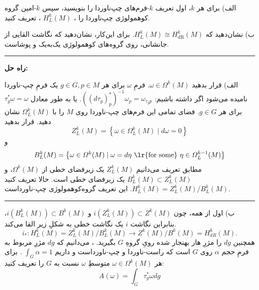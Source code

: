 \documentclass[a4paper, 12pt]{article}
\newenvironment{parind}{%
	\par%
	\medskip
	\leftskip=0mm\rightskip=7mm
	\noindent\ignorespaces}{%
	\par\medskip}
\begin{document}
\begin{parind}
	الف) برای هر $k$، اول تعریف $k$-فرم‌های چپ‌ناوردا را بنویسید، سپس $k$-امین گروه‌ کوهمولوژی چپ‌ناوردا را 
	،
	$H_L^k(M)$
	،
	تعریف کنید.
	
	ب) نشان‌دهید که 
		$H_L^k(M)\cong H_{\text{dR}}^k(M)$.
		برای این‌کار، نشان‌دهید که نگاشت القایی از جانشانی، روی گروه‌های کوهمولوژی یک‌به‌یک و پوشاست.
\end{parind}

\par\noindent\rule{\textwidth}{0.6pt}
\textbf{راه حل:}

الف)
 قرار بدهید $\omega \in \Omega^k(M)$.
  فرمِ $\omega$
   برای هر  $g \in G, p \in M$ یک فرمِ چپ-ناوردا نامیده می‌شود اگر داشته باشیم:
    $\left(\left(d \tau_g\right)_p^*\right)^{-1} \omega_p=\omega_{\tau_g p}$.
     یا به طور معادل $\tau_g^* \omega=\omega$ 
     برای هر
      $g \in G$.
      فضای تمامی این فرم‌های چپ-ناوردا روی
       $M$ 
       را با 
        $\Omega_L^k(M)$
        نشان دهید.
قرار بدهید
$$
Z_L^k(M)=\left\{\omega \in \Omega_L^k(M) \mid d \omega=0\right\}
$$
و
$$
B_L^k(M)=\left\{\omega \in \Omega^k(M) \mid \omega=d \eta \text { \lr{for some} } \eta \in \Omega_L^{k-1}(M)\right\}
$$
مطابق تعریف می‌دانیم $Z_L^k(M)$
یک زیرفضای خطی از  $\Omega^k(M)$،
  و $B_L^k(M) \subset Z_L^k(M)$
   یک زیرفضای خطی است.
حالا تعریف کنید $H_L^k(M)=Z_L^k(M) / B_L^k(M)$. این تعریف گروه‌کوهمولوژی چپ-ناورداست.

\par\noindent\rule{\textwidth}{0.6pt}
ب)
اول از همه، چون  $i\left(Z_L^k(M)\right) \subset Z^k(M)$
 و $i\left(B_L^k(M)\right) \subset B^k(M)$،
   بنابراین نگاشت $i$ یک نگاشت خطی به شکلِ زیر القا می‌کند.
$$
i_*: H_L^k(M)=Z_L^k(M) / B_L^k(M) \rightarrow Z^k(M) / B^k(M)=H_{d R}^k(M) .
$$
 همچنین $d g$
  را مژرِ هار
  بهنجار شده رویِ گروهِ
   $G$
   بگیرید.
  ، می‌دانیم که $d g$
   مژرِ مربوط به فرمِ حجم $\alpha$
    روی $G$
    است که راست-ناوردا و چپ-ناورداست و داریم
     $\int_G \alpha=1$
     . 
     برای هر $\omega \in \Omega^k(M)$
      متوسطِ $\omega$
       نسبت به $G$
        را تعریف کنید:
$$
A(\omega)=\int_G \tau_g^* \omega d g
$$
\end{document}

